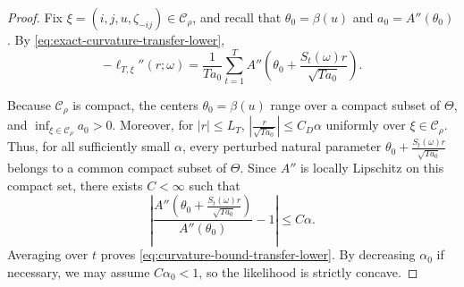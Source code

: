 \documentclass[10pt]{article}
\theoremstyle{plain}
\begin{document}
\begin{proof}
Fix $\xi=(i,j,u,\zeta_{-ij})\in\mathcal C_\rho$, and recall that
    $\theta_0=\beta(u)$
    and
    $a_0=A''(\theta_0)$.
By \eqref{eq:exact-curvature-transfer-lower},
\[
    -\ell_{T,\xi}''(r;\omega)
    =
    \frac{1}{Ta_0}
    \sum_{t=1}^T
        A''\left(
            \theta_0+
            \frac{S_t(\omega)r}{\sqrt{Ta_0}}
        \right).
\]

Because $\mathcal C_\rho$ is compact, the centers $\theta_0=\beta(u)$
range over a compact subset of $\Theta$, and $\inf_{\xi\in\mathcal C_\rho}a_0>0$.
Moreover, for $|r|\le L_T$,
    $\left|
        \frac{r}{\sqrt{Ta_0}}
    \right|
    \le
    C_D\alpha$
uniformly over $\xi\in\mathcal C_\rho$. Thus, for all sufficiently small
$\alpha$, every perturbed natural parameter
    $\theta_0+\frac{S_t(\omega)r}{\sqrt{Ta_0}}$
belongs to a common compact subset of $\Theta$. Since $A''$ is locally
Lipschitz on this compact set, there exists $C<\infty$ such that
\[
    \left|
        \frac{
            A''\left(
                \theta_0+
                \frac{S_t(\omega)r}{\sqrt{Ta_0}}
            \right)
        }{
            A''(\theta_0)
        }
        -1
    \right|
    \le
    C\alpha.
\]
Averaging over $t$ proves
\eqref{eq:curvature-bound-transfer-lower}. By decreasing $\alpha_0$ if
necessary, we may assume $C\alpha_0<1$, so the likelihood is strictly
concave.


\end{proof}
\end{document}
